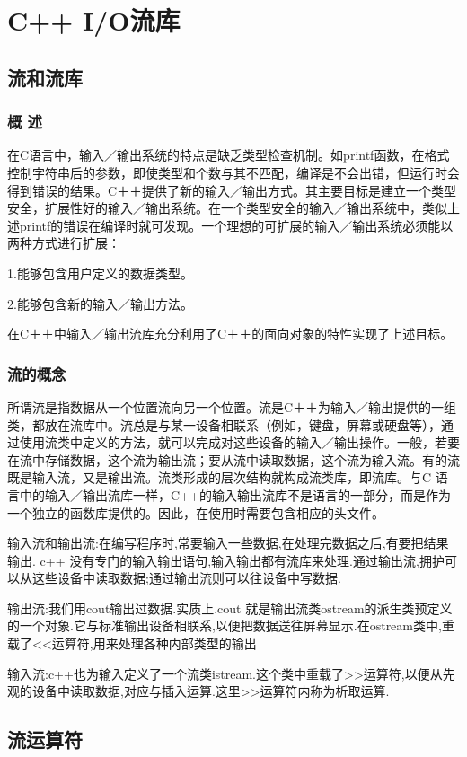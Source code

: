 \documentclass{article}
\begin{document}
\section{C++ I/O流库}
\label{sec-10}
\subsection{流和流库}
\label{sec-10-1}
\subsubsection{概 述}
\label{sec-10-1-1}
在C语言中，输入／输出系统的特点是缺乏类型检查机制。如printf函数，在格式控制字符串后的参数，即使类型和个数与其不匹配，编译是不会出错，但运行时会得到错误的结果。C＋＋提供了新的输入／输出方式。其主要目标是建立一个类型安全，扩展性好的输入／输出系统。在一个类型安全的输入／输出系统中，类似上述printf的错误在编译时就可发现。一个理想的可扩展的输入／输出系统必须能以两种方式进行扩展：

1.能够包含用户定义的数据类型。

2.能够包含新的输入／输出方法。

在C＋＋中输入／输出流库充分利用了C＋＋的面向对象的特性实现了上述目标。
\subsubsection{流的概念}
\label{sec-10-1-2}
所谓流是指数据从一个位置流向另一个位置。流是C＋＋为输入／输出提供的一组类，都放在流库中。流总是与某一设备相联系（例如，键盘，屏幕或硬盘等），通过使用流类中定义的方法，就可以完成对这些设备的输入／输出操作。一般，若要在流中存储数据，这个流为输出流；要从流中读取数据，这个流为输入流。有的流既是输入流，又是输出流。流类形成的层次结构就构成流类库，即流库。与C 语言中的输入／输出流库一样，C++的输入输出流库不是语言的一部分，而是作为一个独立的函数库提供的。因此，在使用时需要包含相应的头文件。

输入流和输出流:在编写程序时,常要输入一些数据,在处理完数据之后,有要把结果输出. c++ 没有专门的输入输出语句,输入输出都有流库来处理.通过输出流,拥护可以从这些设备中读取数据;通过输出流则可以往设备中写数据.

输出流:我们用cout输出过数据.实质上.cout 就是输出流类ostream的派生类预定义的一个对象.它与标准输出设备相联系,以便把数据送往屏幕显示.在ostream类中,重载了<<运算符,用来处理各种内部类型的输出

输入流:c++也为输入定义了一个流类istream.这个类中重载了>>运算符,以便从先观的设备中读取数据,对应与插入运算.这里>>运算符内称为析取运算.
\subsection{流运算符}
\label{sec-10-2}
\end{document}
